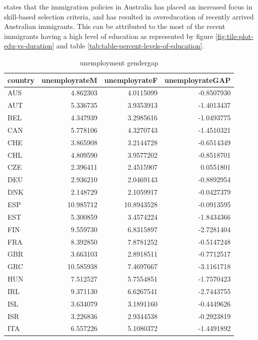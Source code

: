 \documentclass[11pt,a4paper,]{article}
\begin{document}
\textcite{green2007immigrant} states that the immigration policies in Australia has placed an increased focus in skill-based selection criteria, and has resulted in overeducation of recently arrived Australian immigrants. This can be attributed to the most of the recent immigrants having a high level of education as represented by figure \ref{fig:tile-plot-edu-vs-duration} and table \ref{tab:table-percent-levels-of-education}.

\begin{table}

\caption{\label{tab:unnamed-chunk-13}unemployment gendergap}
\centering
\begin{tabular}[t]{l|r|r|r}
\hline
country & unemployrateM & unemployrateF & unemployrateGAP\\
\hline
AUS & 4.862303 & 4.0115099 & -0.8507930\\
\hline
AUT & 5.336735 & 3.9353913 & -1.4013437\\
\hline
BEL & 4.347939 & 3.2985616 & -1.0493775\\
\hline
CAN & 5.778106 & 4.3270743 & -1.4510321\\
\hline
CHE & 3.865908 & 3.2144728 & -0.6514349\\
\hline
CHL & 4.809590 & 3.9577202 & -0.8518701\\
\hline
CZE & 2.396411 & 2.4515907 & 0.0551801\\
\hline
DEU & 2.936210 & 2.0469143 & -0.8892954\\
\hline
DNK & 2.148729 & 2.1059917 & -0.0427379\\
\hline
ESP & 10.985712 & 10.8943528 & -0.0913595\\
\hline
EST & 5.300859 & 3.4574224 & -1.8434366\\
\hline
FIN & 9.559730 & 6.8315897 & -2.7281404\\
\hline
FRA & 8.392850 & 7.8781252 & -0.5147248\\
\hline
GBR & 3.663103 & 2.8918511 & -0.7712517\\
\hline
GRC & 10.585938 & 7.4697667 & -3.1161718\\
\hline
HUN & 7.512527 & 5.7554851 & -1.7570423\\
\hline
IRL & 9.371130 & 6.6267541 & -2.7443755\\
\hline
ISL & 3.634079 & 3.1891160 & -0.4449626\\
\hline
ISR & 3.226836 & 2.9344538 & -0.2923819\\
\hline
ITA & 6.557226 & 5.1080372 & -1.4491892\\
\hline

\end{tabular}
\end{table}
\end{document}
